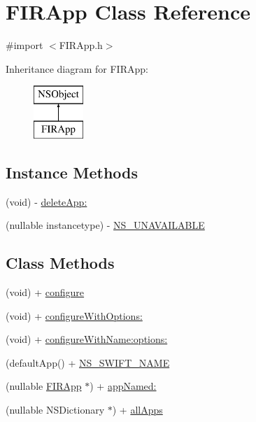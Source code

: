 \hypertarget{interface_f_i_r_app}{}\section{F\+I\+R\+App Class Reference}
\label{interface_f_i_r_app}


{\ttfamily \#import $<$F\+I\+R\+App.\+h$>$}

Inheritance diagram for F\+I\+R\+App\+:\begin{figure}[H]
\begin{center}
\leavevmode
\includegraphics[height=2.000000cm]{interface_f_i_r_app}
\end{center}
\end{figure}
\subsection*{Instance Methods}
\begin{DoxyCompactItemize}
\item 
(void) -\/ \hyperlink{interface_f_i_r_app_ac58faffee0f92780532f5b58986c100a}{delete\+App\+:}
\item 
(nullable instancetype) -\/ \hyperlink{interface_f_i_r_app_a7a3365b06f49a8dc13cc39b0ab15047a}{N\+S\+\_\+\+U\+N\+A\+V\+A\+I\+L\+A\+B\+L\+E}
\end{DoxyCompactItemize}
\subsection*{Class Methods}
\begin{DoxyCompactItemize}
\item 
(void) + \hyperlink{interface_f_i_r_app_a4fcb4890baccad094cffe3ea4d25d764}{configure}
\item 
(void) + \hyperlink{interface_f_i_r_app_a2e4b970bfb6ed8b606c456f42a82b967}{configure\+With\+Options\+:}
\item 
(void) + \hyperlink{interface_f_i_r_app_ab9ce69bec960856900bcf1265bba98b6}{configure\+With\+Name\+:options\+:}
\item 
(default\+App() + \hyperlink{interface_f_i_r_app_a3c93e9f896c81011866c1decbed30411}{N\+S\+\_\+\+S\+W\+I\+F\+T\+\_\+\+N\+A\+M\+E}
\item 
(nullable \hyperlink{interface_f_i_r_app}{F\+I\+R\+App} $\ast$) + \hyperlink{interface_f_i_r_app_a16d4ec3d3382378b9346d6a99ed9d9d7}{app\+Named\+:}
\item 
(nullable N\+S\+Dictionary $\ast$) + \hyperlink{interface_f_i_r_app_aa1d0f87e8e35a8b1d4d87b9e05879514}{all\+Apps}
\end{DoxyCompactItemize}
